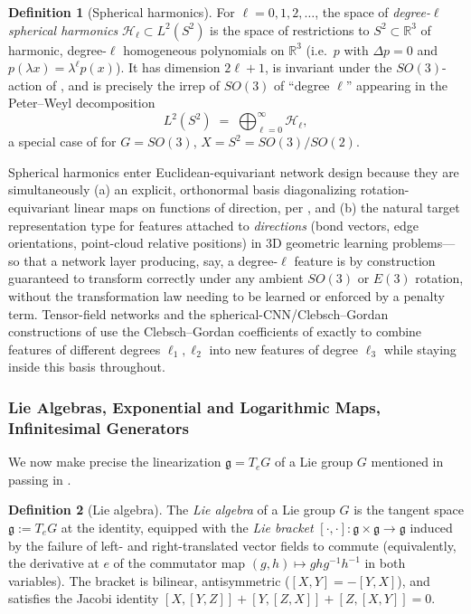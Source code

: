 \documentclass[11pt]{article}
\theoremstyle{plain}
\theoremstyle{definition}
\newtheorem{Definition}{Definition}[section]
\begin{document}
\begin{Definition}[Spherical harmonics]
\label{def:spherical-harmonics}
For $\ell = 0, 1, 2, \dots$, the space of \emph{degree-$\ell$ spherical
harmonics} $\mathcal{H}_\ell \subset L^2(S^2)$ is the space of restrictions
to $S^2 \subset \mathbb{R}^3$ of harmonic, degree-$\ell$ homogeneous
polynomials on $\mathbb{R}^3$ (i.e.\ $p$ with $\Delta p = 0$ and
$p(\lambda x) = \lambda^\ell p(x)$). It has dimension $2\ell+1$, is invariant
under the $SO(3)$-action of , and is
precisely the irrep of $SO(3)$ of ``degree $\ell$'' appearing in the
Peter--Weyl decomposition
\[
    L^2(S^2) \;=\; \bigoplus_{\ell = 0}^{\infty} \mathcal{H}_\ell,
\]
a special case of  for
$G = SO(3)$, $X = S^2 = SO(3)/SO(2)$.
\end{Definition}

Spherical harmonics enter Euclidean-equivariant network design because they
are simultaneously (a) an explicit, orthonormal basis diagonalizing
rotation-equivariant linear maps on functions of direction, per
, and (b) the natural target
representation type for features attached to \emph{directions} (bond
vectors, edge orientations, point-cloud relative positions) in 3D geometric
learning problems---so that a network layer producing, say, a degree-$\ell$
feature is by construction guaranteed to transform correctly under any
ambient $SO(3)$ or $E(3)$ rotation, without the transformation law needing
to be learned or enforced by a penalty term. Tensor-field networks and the
spherical-CNN/Clebsch--Gordan constructions of \citet{kondor2018p3icml} use
the Clebsch--Gordan coefficients of  exactly
to combine features of different degrees $\ell_1, \ell_2$ into new features
of degree $\ell_3$ while staying inside this basis throughout.

\subsubsection{Lie Algebras, Exponential and Logarithmic Maps, Infinitesimal Generators}
\label{subsec:lie-algebras}

We now make precise the linearization $\mathfrak{g} = T_eG$ of a Lie group
$G$ mentioned in passing in .

\begin{Definition}[Lie algebra]
\label{def:lie-algebra}
The \emph{Lie algebra} of a Lie group $G$ is the tangent space
$\mathfrak{g} := T_e G$ at the identity, equipped with the \emph{Lie
bracket} $[\cdot,\cdot] : \mathfrak{g} \times \mathfrak{g} \to \mathfrak{g}$
induced by the failure of left- and right-translated vector fields to
commute (equivalently, the derivative at $e$ of the commutator map
$(g,h) \mapsto ghg^{-1}h^{-1}$ in both variables). The bracket is bilinear,
antisymmetric ($[X,Y] = -[Y,X]$), and satisfies the Jacobi identity
$[X,[Y,Z]] + [Y,[Z,X]] + [Z,[X,Y]] = 0$.
\end{Definition}
\end{document}
